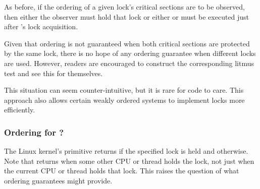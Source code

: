 \QuickQuizEnd

As before, if the ordering of a given lock's critical sections are to
be observed, then either the observer must hold that lock or either
 or  must
be executed just after 's lock acquisition.

Given that ordering is not guaranteed when both critical sections are
protected by the same lock, there is no hope of any ordering guarantee
when different locks are used.
However, readers are encouraged to construct the corresponding litmus
test and see this for themselves.

This situation can seem counter-intuitive, but it is rare for code to
care.
This approach also allows certain weakly ordered systems to implement
locks more efficiently.

\subsubsection{Ordering for ?}
\label{sec:memorder:Ordering for spin-is-locked()?}

The Linux kernel's  primitive returns
 if the specified lock is held and  otherwise.
Note that  returns  when some other
CPU or thread holds the lock, not just when the current CPU or thread
holds that lock.
This raises the question of what ordering guarantees 
might provide.


